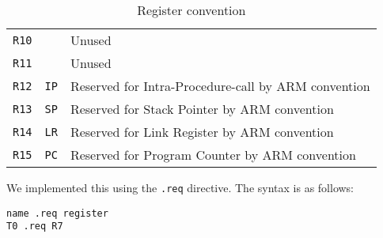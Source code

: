 \begin{table}[h!]
\begin{tabular}{l | l | l}
        \texttt{R10}    & ~                 & Unused                                                 \\
        \texttt{R11}    & ~                 & Unused                                                 \\
        \texttt{R12}    & \texttt{IP}       & Reserved for Intra-Procedure-call by ARM convention    \\
        \texttt{R13}    & \texttt{SP}       & Reserved for Stack Pointer by ARM convention           \\
        \texttt{R14}    & \texttt{LR}       & Reserved for Link Register  by ARM convention          \\
        \texttt{R15}    & \texttt{PC}       & Reserved for Program Counter by ARM convention         \\
    \end{tabular}
    \caption{Register convention}
\end{table}

We implemented this using the \texttt{.req} directive. The syntax is as follows:

\begin{lstlisting}[label=register-aliasing,caption=Register aliasing]
name .req register
T0 .req R7
\end{lstlisting}

